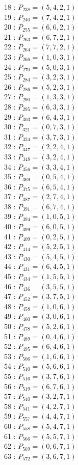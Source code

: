 \documentclass{article}
\begin{document}
{\begin{multicols}{2}
18 : $P_{238}=( 5, 4, 2, 1 )$\\
19 : $P_{240}=( 7, 4, 2, 1 )$\\
20 : $P_{255}=( 6, 6, 2, 1 )$\\
21 : $P_{263}=( 6, 7, 2, 1 )$\\
22 : $P_{264}=( 7, 7, 2, 1 )$\\
23 : $P_{266}=( 1, 0, 3, 1 )$\\
24 : $P_{270}=( 5, 0, 3, 1 )$\\
25 : $P_{284}=( 3, 2, 3, 1 )$\\
26 : $P_{286}=( 5, 2, 3, 1 )$\\
27 : $P_{290}=( 1, 3, 3, 1 )$\\
28 : $P_{295}=( 6, 3, 3, 1 )$\\
29 : $P_{303}=( 6, 4, 3, 1 )$\\
30 : $P_{321}=( 0, 7, 3, 1 )$\\
31 : $P_{324}=( 3, 7, 3, 1 )$\\
32 : $P_{347}=( 2, 2, 4, 1 )$\\
33 : $P_{348}=( 3, 2, 4, 1 )$\\
34 : $P_{356}=( 3, 3, 4, 1 )$\\
35 : $P_{369}=( 0, 5, 4, 1 )$\\
36 : $P_{375}=( 6, 5, 4, 1 )$\\
37 : $P_{387}=( 2, 7, 4, 1 )$\\
38 : $P_{391}=( 6, 7, 4, 1 )$\\
39 : $P_{394}=( 1, 0, 5, 1 )$\\
40 : $P_{399}=( 6, 0, 5, 1 )$\\
41 : $P_{409}=( 0, 2, 5, 1 )$\\
42 : $P_{414}=( 5, 2, 5, 1 )$\\
43 : $P_{430}=( 5, 4, 5, 1 )$\\
44 : $P_{431}=( 6, 4, 5, 1 )$\\
45 : $P_{434}=( 1, 5, 5, 1 )$\\
46 : $P_{436}=( 3, 5, 5, 1 )$\\
47 : $P_{452}=( 3, 7, 5, 1 )$\\
48 : $P_{458}=( 1, 0, 6, 1 )$\\
49 : $P_{460}=( 3, 0, 6, 1 )$\\
50 : $P_{478}=( 5, 2, 6, 1 )$\\
51 : $P_{489}=( 0, 4, 6, 1 )$\\
52 : $P_{495}=( 6, 4, 6, 1 )$\\
53 : $P_{506}=( 1, 6, 6, 1 )$\\
54 : $P_{510}=( 5, 6, 6, 1 )$\\
55 : $P_{516}=( 3, 7, 6, 1 )$\\
56 : $P_{519}=( 6, 7, 6, 1 )$\\
57 : $P_{540}=( 3, 2, 7, 1 )$\\
58 : $P_{541}=( 4, 2, 7, 1 )$\\
59 : $P_{557}=( 4, 4, 7, 1 )$\\
60 : $P_{558}=( 5, 4, 7, 1 )$\\
61 : $P_{566}=( 5, 5, 7, 1 )$\\
62 : $P_{569}=( 0, 6, 7, 1 )$\\
63 : $P_{572}=( 3, 6, 7, 1 )$\\
\end{multicols}
}
\end{document}
